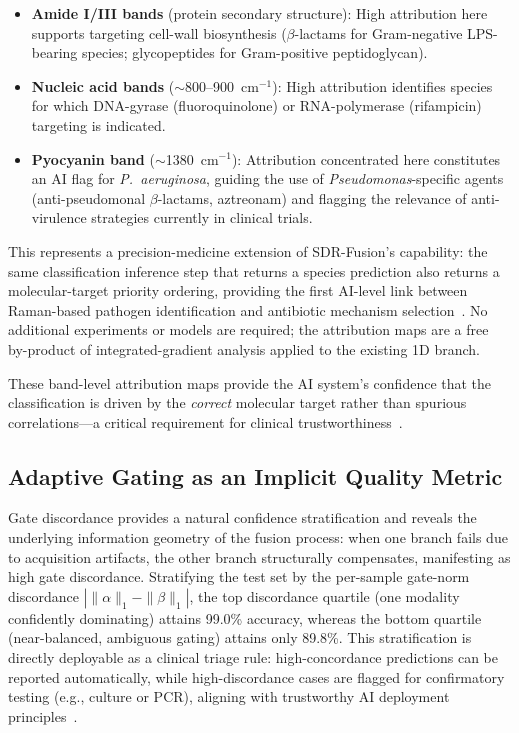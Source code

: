 \documentclass[preprint,12pt]{elsarticle}
\begin{document}
\begin{itemize}
  \item \textbf{Amide I/III bands} (protein secondary structure):
        High attribution here supports targeting cell-wall biosynthesis
        ($\beta$-lactams for Gram-negative LPS-bearing species;
        glycopeptides for Gram-positive peptidoglycan).
  \item \textbf{Nucleic acid bands} ($\sim$800--900~cm$^{-1}$):
        High attribution identifies species for which DNA-gyrase
        (fluoroquinolone) or RNA-polymerase (rifampicin) targeting is
        indicated.
  \item \textbf{Pyocyanin band} ($\sim$1380~cm$^{-1}$): Attribution
        concentrated here constitutes an AI flag for
        \textit{P.~aeruginosa}, guiding the use of
        \textit{Pseudomonas}-specific agents (anti-pseudomonal
        $\beta$-lactams, aztreonam) and flagging the relevance of
        anti-virulence strategies currently in clinical trials.
\end{itemize}

This represents a precision-medicine extension of SDR-Fusion's
capability: the same classification inference step that returns a
species prediction also returns a molecular-target priority ordering,
providing the first AI-level link between Raman-based pathogen
identification and antibiotic mechanism
selection~\cite{holzinger2022information,singh2022culture}. No
additional experiments or models are required; the attribution maps
are a free by-product of integrated-gradient analysis applied to the
existing 1D branch.

These band-level attribution maps provide the AI system's confidence
that the classification is driven by the \emph{correct} molecular
target rather than spurious correlations---a critical requirement for
clinical trustworthiness~\cite{holzinger2022information}.

\subsection{Adaptive Gating as an Implicit Quality Metric}
\label{ssec:gating_disc}

Gate discordance provides a natural confidence stratification and
reveals the underlying information geometry of the fusion process:
when one branch fails due to acquisition artifacts, the other branch
structurally compensates, manifesting as high gate discordance.
Stratifying the test set by the per-sample gate-norm discordance
$|\|\alpha\|_1{-}\|\beta\|_1|$, the top discordance quartile (one
modality confidently dominating) attains 99.0\% accuracy, whereas the
bottom quartile (near-balanced, ambiguous gating) attains only
89.8\%. This stratification is directly deployable
as a clinical triage rule: high-concordance predictions can be
reported automatically, while high-discordance cases are flagged for
confirmatory testing (e.g., culture or PCR), aligning with
trustworthy AI deployment
principles~\cite{holzinger2022information}.
\end{document}
